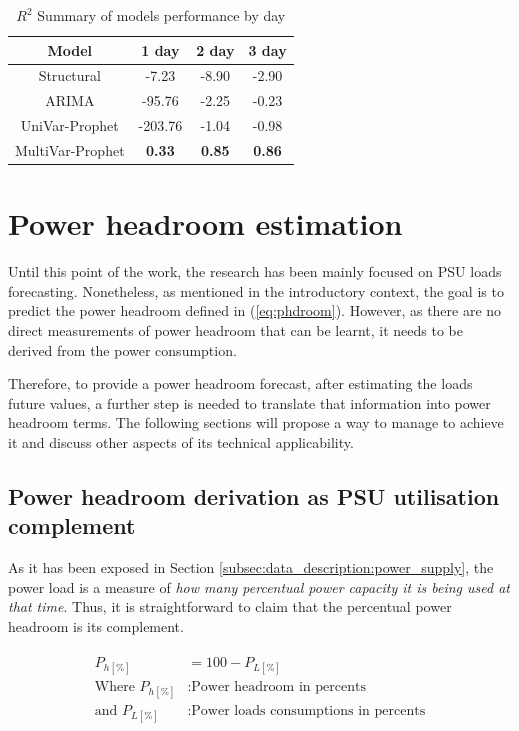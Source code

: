 \begin{table}[H]
	\centering
	\begin{tabular}{|c|c|c|c|}
		\hline
		\textbf{Model} & \textbf{1 day} & \textbf{2 day}	& \textbf{3 day} \\
		\hline
		Structural		 & 		-7.23 	&		-8.90 		& -2.90 		  \\
		\hline
		ARIMA 			 &		-95.76 	& 		-2.25		& -0.23 		  \\
		\hline
		UniVar-Prophet 	 & 		-203.76	& 		-1.04 		& -0.98 	      \\
		\hline
		MultiVar-Prophet & \textbf{0.33}& 	\textbf{0.85} 	& \textbf{0.86} \\
		\hline
	\end{tabular}
	\caption{$R^2$ Summary of models performance by day}
	\label{table:r2_perf_summary}
\end{table}



\section{Power headroom estimation}

Until this point of the work, the research has been mainly focused on PSU loads forecasting. Nonetheless, as mentioned in the introductory context, the goal is to predict the power headroom defined in (\ref{eq:phdroom}). However, as there are no direct measurements of power headroom that can be learnt, it needs to be derived from the power consumption.  

Therefore, to provide a power headroom forecast, after estimating the loads future values, a further step is needed to translate that information into power headroom terms. The following sections will propose a way to manage to achieve it and discuss other aspects of its technical applicability.

\subsection{Power headroom derivation as PSU utilisation complement}

As it has been exposed in Section \ref{subsec:data_description:power_supply}, the power load is a measure of \emph{how many percentual power capacity it is being used at that time}. Thus, it is straightforward to claim that the percentual power headroom is its complement.

\begin{align}\label{eq:ph_deriv}
	\begin{split}
		P_{h[\%]}	&= 100 - P_{L[\%]} \\
		\text{Where }P_{h[\%]}	&: \text{Power headroom in percents} \\
		\text{and } P_{L[\%]}	&: \text{Power loads consumptions in percents}
	\end{split}
\end{align}

